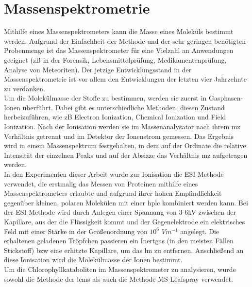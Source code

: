 \section{Massenspektrometrie}

Mithilfe eines Massenspektrometers kann die Masse eines Moleküls bestimmt werden. Aufgrund der Einfachheit der Methode und der sehr geringen benötigten Probenmenge ist das Massenspektrometer für eine Vielzahl an Anwendungen geeignet (\gls{zB} in der Forensik, Lebensmittelprüfung, Medikamentenprüfung, Analyse von Meteoriten). \cite[S. 1]{MassSpectrometry} Der jetzige Entwicklungsstand in der Massenspektrometrie ist vor allem den Entwicklungen der letzten vier Jahrzehnte zu verdanken. \cite[S. 6-9]{MassSpectrometry} \\

Um die Molekülmasse der Stoffe zu bestimmen, werden sie zuerst in Gasphasen-Ionen überführt. \cite[S. 15]{MassSpectrometry} Dabei gibt es unterschiedliche Methoden, diesen Zustand herbeizuführen, wie \gls{zB} Electron Ionization, Chemical Ionization und Field Ionization. \cite[S. 15-30]{MassSpectrometry} Nach der Ionisation werden sie im Massenanalysator nach ihrem \gls{mz} Verhältnis getrennt und im Detektor der Ionenstrom gemessen. Das Ergebnis wird in einem Massenspektrum festgehalten, in dem auf der Ordinate die relative Intensität der einzelnen Peaks und auf der Absizze das Verhältnis \gls{mz} aufgetragen werden. \\

In den Experimenten dieser Arbeit wurde zur Ionisation die \gls{ESI} Methode verwendet, die erstmalig das Messen von Proteinen mithilfe eines Massenspektrometers erlaubte und aufgrund ihrer hohen Empfindlichkeit gegenüber kleinen, polaren Molekülen mit einer \gls{hplc} kombiniert werden kann. Bei der \gls{ESI} Methode wird durch Anlegen einer Spannung von 3-6kV zwischen der Kapillare, aus der die Flüssigkeit kommt und der Gegenelektrode ein elektrisches Feld mit einer Stärke in der Größenordnung von $10^{6}$ $Vm^{-1}$ angelegt. Die erhaltenen geladenen Tröpfchen passieren ein Inertgas (in den meisten Fällen Stickstoff) \gls{bzw} eine erhitzte Kapillare, um das \gls{lm} zu entfernen. Anschließend an diese Ionisation wird die Molekülmasse der Ionen bestimmt. \cite[S. 43-44]{MassSpectrometry} \\

Um die Chlorophyllkataboliten im Massenspektrometer zu analysieren, wurde sowohl die Methode der \gls{lcms} als auch die Methode MS-Leafspray verwendet. 

